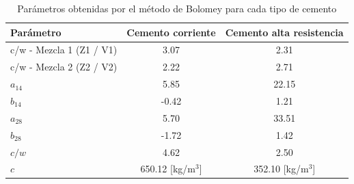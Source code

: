 \begin{table}[H]
\centering
\caption{Parámetros obtenidas por el método de Bolomey para cada tipo de cemento}
\renewcommand{\arraystretch}{1.15}
\small
\begin{tabular}{lcc}
\hline
Parámetro & Cemento corriente & Cemento alta resistencia \\ \hline
c/w - Mezcla 1 (Z1 / V1) & 3.07 & 2.31 \\
c/w - Mezcla 2 (Z2 / V2) & 2.22 & 2.71 \\
$a_{14}$ & 5.85 & 22.15 \\
$b_{14}$ & -0.42 & 1.21 \\
$a_{28}$ & 5.70 & 33.51 \\
$b_{28}$ & -1.72 & 1.42 \\
$c/w$ & 4.62 & 2.50 \\ 
$c$ & 650.12 [kg/m$^3$] & 352.10 [kg/m$^3$] \\ \hline
\end{tabular}
\end{table}

